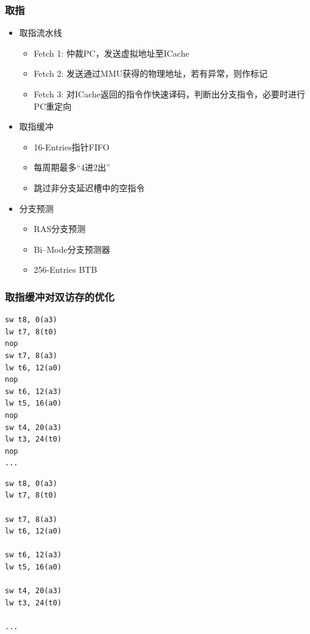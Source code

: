 \documentclass{beamer}
\begin{document}
\begin{frame}
    \frametitle{取指}
    \begin{itemize}
        \item 取指流水线\begin{itemize}
            \item Fetch 1: 仲裁PC，发送虚拟地址至ICache
            \item Fetch 2: 发送通过MMU获得的物理地址，若有异常，则作标记
            \item Fetch 3: 对ICache返回的指令作快速译码，判断出分支指令，必要时进行PC重定向
        \end{itemize}
        \item 取指缓冲\begin{itemize}
            \item 16-Entries指针FIFO
            \item 每周期最多“4进2出”
            \item 跳过非分支延迟槽中的空指令
        \end{itemize}
        \item 分支预测\begin{itemize}
            \item RAS分支预测
            \item Bi--Mode分支预测器
            \item 256-Entries BTB
        \end{itemize}
    \end{itemize}
\end{frame}

\begin{frame}[fragile]
    \frametitle{取指缓冲对双访存的优化}
    \begin{minipage}[c]{0.4\linewidth}
\begin{lstlisting}
sw t8, 0(a3)
lw t7, 8(t0)
nop
sw t7, 8(a3)
lw t6, 12(a0)
nop
sw t6, 12(a3)
lw t5, 16(a0)
nop
sw t4, 20(a3)
lw t3, 24(t0)
nop
...
\end{lstlisting}
    \end{minipage}\hfill
\begin{minipage}{0.4\linewidth}
\begin{lstlisting}
sw t8, 0(a3)
lw t7, 8(t0)

sw t7, 8(a3)
lw t6, 12(a0)

sw t6, 12(a3)
lw t5, 16(a0)

sw t4, 20(a3)
lw t3, 24(t0)

...
\end{lstlisting}
    
\end{minipage}
\end{frame}
\end{document}
